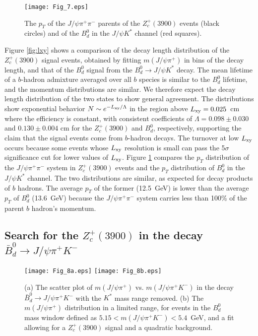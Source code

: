 \documentclass[aps,prd,twocolumn,superscriptaddress,groupedaddress,floatfix]{revtex4}
\begin{document}
\begin{figure}[htb]
\texttt{[image: Fig\_7.eps]}
\caption{\label{fig:pt} 
The $p_T$  of  the $J/\psi \pi^+ \pi^-$ parents of the  $Z_c^+(3900)$ events  (black  circles)
 and  of the $B^0_d$ in the 
$J/\psi  K^*$ channel  (red squares).
}
\end{figure}



Figure \ref{fig:lxy} shows a comparison of    the decay length  distribution of the $Z_c^+(3900)$
 signal events, obtained
by fitting $m(J/\psi \pi^+)$ in bins of the decay length,
and that of  the $B^0_d$ signal from the
 $B^0_d \rightarrow J/\psi K^*$ decay. The mean lifetime of a $b$-hadron admixture averaged
over all $b$ species is similar to the $B^0_d$ lifetime, and the momentum distributions
are similar.
We therefore  expect the  decay length distribution of the two states to show general agreement.
The  distributions show exponential behavior
$N \sim e^{-L_{\rm xy}/\Lambda}$
 in the region above $L_{\rm xy}=0.025$~cm
where the efficiency is constant,
 with consistent coefficients of 
$\Lambda=0.098\pm0.030$ and $0.130\pm0.004$ cm for the $Z_c^+(3900)$ and $B^0_d$, respectively,
  supporting the claim
that the signal events come from  $b$-hadron decays.
The turnover at low $L_{\rm xy}$  occurs because  some  events whose $L_{\rm xy}$ resolution is small
can pass the 5$\sigma$ significance cut for lower values  of   $L_{\rm xy}$.
Figure \ref{fig:pt} compares   the $p_T$   distribution of the 
$J/\psi \pi^+ \pi^-$  system in  $Z_c^+(3900)$  events and the $p_T$ distribution
of $B^0_d$ in the $J/\psi K^*$ channel. The two distributions are similar, as expected
for decay products of $b$ hadrons.
The average $p_T$ of the former (12.5~GeV) 
is lower than the average $p_T$ of  $B^0_d$ (13.6~GeV)
because the $J/\psi \pi^+ \pi^-$ system  carries less than 100\% of the parent $b$ hadron's momentum. 





\subsection{Search for the  {\boldmath $Z_c^+(3900)$} in the decay {\boldmath $\bar B^0_d \rightarrow J/\psi \pi^+ K^-$}}


\begin{figure}[htb]
\texttt{[image: Fig\_8a.eps]}
\texttt{[image: Fig\_8b.eps]}
\caption{\label{fig:zfromb0} 
(a) The scatter plot of $m(J/\psi \pi^+)$ vs.  $m(J/\psi \pi^+ K^-)$
  in the decay  $\bar B^0_d \rightarrow J/\psi \pi^+ K^-$ with the $K^*$ mass range removed.
(b)  The  $m(J/\psi \pi^+)$ distribution in a limited range, for events in the $B^0_d$ mass
window defined as  $5.15<m(J/\psi \pi^+ K^-)<5.4$~GeV,
and a fit allowing for a  $Z_c^+(3900)$ signal and a quadratic background.
}
\end{figure}
\end{document}
